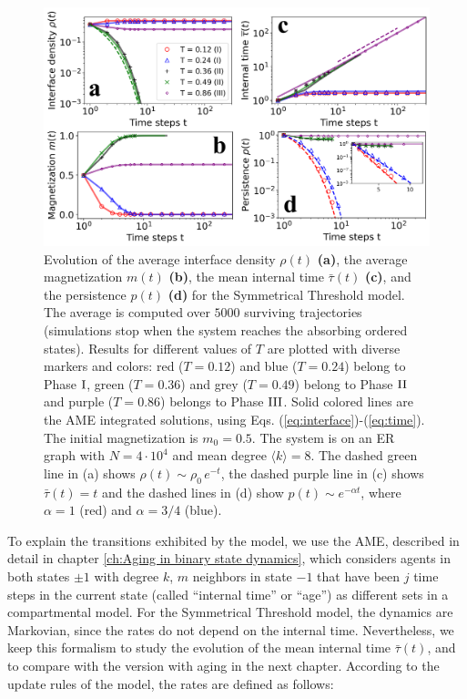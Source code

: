 \begin{figure}[ht]
	\centering \captionsetup{font=sf}
	\includegraphics[width=\textwidth]{Figs/Aging_STM/FIG3.pdf}
	\caption[Symmetrical Threshold model dynamics in random networks]{\label{fig:evolution_random} Evolution of the average interface density $\rho(t)$ \textbf{(a)}, the average magnetization $m(t)$ \textbf{(b)}, the mean internal time $\bar{\tau}(t)$ \textbf{(c)}, and the persistence $p(t)$ \textbf{(d)} for the Symmetrical Threshold model. The average is computed over $5000$ surviving trajectories (simulations stop when the system reaches the absorbing ordered states). Results for different values of $T$ are plotted with diverse markers and colors: red ($T = 0.12$) and blue ($T = 0.24$) belong to Phase ${\rm I}$, green ($T = 0.36$) and grey ($T = 0.49$) belong to Phase ${\rm II}$ and purple ($T = 0.86$) belongs to Phase ${\rm III}$. Solid colored lines are the AME integrated solutions, using Eqs. (\ref{eq:interface})-(\ref{eq:time}). The initial magnetization is $m_0 = 0.5$. The system is on an ER graph with $N = 4 \cdot 10^4$ and mean degree $\langle k \rangle = 8$. The dashed green line in (a) shows $\rho(t) \sim \rho_0 \, e^{-t}$, the dashed purple line in (c) shows $\bar{\tau}(t) = t$ and the dashed lines in (d) show $p(t) \sim e^{-\alpha t}$, where $\alpha = 1$ (red) and $\alpha = 3/4$ (blue). 
	}
\end{figure}
To explain the transitions exhibited by the model, we use the AME, described in detail in chapter \ref{ch:Aging in binary state dynamics}, which considers agents in both states $\pm 1$ with degree $k$, $m$ neighbors in state $-1$ that have been $j$ time steps in the current state (called ``internal time'' or ``age'') as different sets in a compartmental model. For the Symmetrical Threshold model, the dynamics are Markovian, since the rates do not depend on the internal time. Nevertheless, we keep this formalism to study the evolution of the mean internal time $\bar{\tau}(t)$, and to compare with the version with aging in the next chapter. According to the update rules of the model, the rates are defined as follows:
